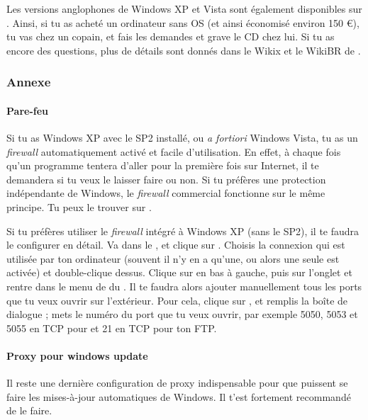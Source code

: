 Les versions anglophones de Windows XP et Vista sont également disponibles sur .
Ainsi, si tu as acheté un ordinateur sans OS (et ainsi économisé environ 150 \euro), tu vas chez un copain, et fais les demandes et grave le CD chez lui. Si tu as encore des questions, plus de détails sont donnés dans le Wikix et le WikiBR de \fkz.


\subsubsection{Annexe%
}

\label{horsdomaine} %

\paragraph{Pare-feu} Si tu as Windows XP avec le SP2 installé, ou \emph{a fortiori}
Windows Vista, tu as un \emph{firewall} automatiquement activé et facile d'utilisation. En effet, à chaque fois qu'un programme tentera d'aller pour
la première fois sur Internet, il te demandera si tu veux le laisser faire ou non. Si tu préfères une protection indépendante de Windows, le
\emph{firewall} commercial  fonctionne sur le même principe. Tu peux le trouver sur \xshare.

Si tu préfères utiliser le \emph{firewall} intégré à Windows XP (sans le SP2), il te faudra le configurer en détail. Va dans le ,
 et clique sur . Choisis la connexion qui est utilisée par ton ordinateur (souvent il n'y en a qu'une, ou
alors une seule est activée) et double-clique dessus. Clique sur  en bas à gauche, puis sur l'onglet  et rentre dans le
menu de  du . Il te faudra alors ajouter manuellement tous les ports que tu veux ouvrir sur l'extérieur. Pour
cela, clique sur , et remplis la boîte de dialogue%
; mets le numéro du port que tu veux ouvrir, par exemple 5050, 5053 et 5055 en TCP pour  et 21 en TCP pour ton FTP.

\paragraph{Proxy pour windows update} Il reste une dernière configuration de
proxy indispensable pour que puissent se faire les mises-à-jour automatiques
de Windows. Il t'est fortement recommandé de le faire.

